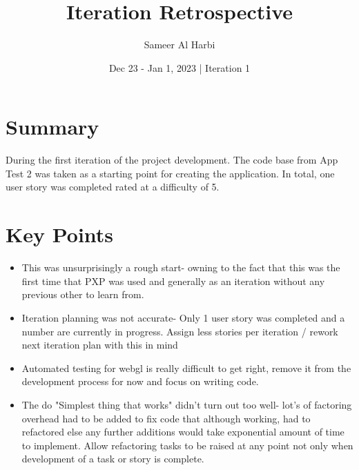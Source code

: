 \documentclass{article}
\title{Iteration Retrospective}
\author{Sameer Al Harbi}
\date{Dec 23 - Jan 1, 2023 | Iteration 1}
\begin{document}
\maketitle

\section{Summary}
During the first iteration of the project development. The code base from App Test 2 was taken as a starting point for creating the application. In total, one user story was completed rated at a difficulty of 5. 
\section{Key Points}
\begin{itemize}
    \item This was unsurprisingly a rough start- owning to the fact that this was the first time that PXP was used and generally as an iteration without any previous other to learn from. 
    \item Iteration planning was not accurate- Only 1 user story was completed and a number are currently in progress. Assign less stories per iteration / rework next iteration plan with this in mind
    \item Automated testing for webgl is really difficult to get right, remove it from the development process for now and focus on writing code. 
    \item The do "Simplest thing that works" didn't turn out too well- lot's of factoring overhead had to be added to fix code that although working, had to refactored else any further additions would take exponential amount of time to implement. Allow refactoring tasks to be raised at any point not only when development of a task or story is complete. 
\end{itemize}
\end{document}
